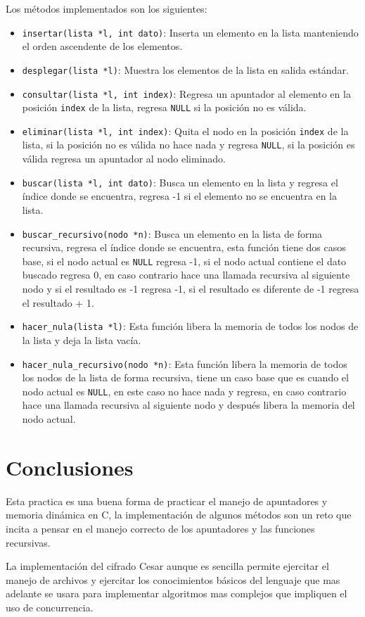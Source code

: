 \documentclass {article}
\begin{document}
Los métodos implementados son los siguientes:
\begin{itemize}
    \item \texttt{insertar(lista *l, int dato)}: 
    Inserta un elemento en la lista manteniendo el orden 
    ascendente de los elementos.

    \item \texttt{desplegar(lista *l)}: 
    Muestra los elementos de la lista en salida estándar.

    \item \texttt{consultar(lista *l, int index)}:
    Regresa un apuntador al elemento en la posición \texttt{index} 
    de la lista, regresa \texttt{NULL} si la posición no es válida.

    \item \texttt{eliminar(lista *l, int index)}: Quita el nodo en la 
    posición \texttt{index} de la lista, si la posición no es válida
    no hace nada y regresa \texttt{NULL}, si la posición es válida 
    regresa un apuntador al nodo eliminado.

    \item \texttt{buscar(lista *l, int dato)}: 
    Busca un elemento en la lista y regresa el índice donde se encuentra,
    regresa -1 si el elemento no se encuentra en la lista.
    
    \item \texttt{buscar\_recursivo(nodo *n)}:
    Busca un elemento en la lista de forma recursiva, regresa el índice
    donde se encuentra, esta función tiene dos casos base, 
    si el nodo actual es \texttt{NULL} regresa -1, si el nodo actual
    contiene el dato buscado regresa 0, en caso contrario hace una llamada
    recursiva al siguiente nodo y si el resultado es -1 regresa -1,
    si el resultado es diferente de -1 regresa el resultado + 1.

    \item \texttt{hacer\_nula(lista *l)}:
    Esta función libera la memoria de todos los nodos de la lista y 
    deja la lista vacía.

    \item \texttt{hacer\_nula\_recursivo(nodo *n)}:
    Esta función libera la memoria de todos los nodos de la lista de
    forma recursiva, tiene un caso base que es cuando el nodo actual
    es \texttt{NULL}, en este caso no hace nada y regresa, en caso 
    contrario hace una llamada recursiva al siguiente nodo y después 
    libera la memoria del nodo actual.
\end{itemize}

\section{Conclusiones}

Esta practica es una buena forma de practicar el manejo de apuntadores
y memoria dinámica en C, la implementación de algunos métodos son un 
reto que incita a pensar en el manejo correcto de los apuntadores y las 
funciones recursivas.

La implementación del cifrado Cesar aunque es sencilla permite ejercitar
el manejo de archivos y ejercitar los conocimientos básicos del lenguaje
que mas adelante se usara para implementar algoritmos mas complejos que 
impliquen el uso de concurrencia.
\end{document}
